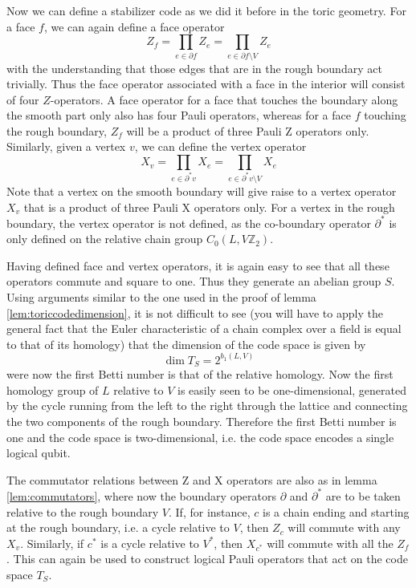 \documentclass[a4paper, draft]{article}
\theoremstyle{own}
\theoremstyle{remark}
\newcommand{\Z}{\mathbb{Z}}
\begin{document}
Now we can define a stabilizer code as we did it before in the toric geometry. For a face $f$, we can again define a face operator
$$
Z_f = \prod_{e \in \partial f} Z_e = \prod_{e \in \partial f \setminus V} Z_e
$$
with the understanding that those edges that are in the rough boundary act trivially. Thus the face operator associated with a face in the interior will consist of four $Z$-operators. A face operator for a face that touches the boundary along the smooth part only also has four Pauli operators, whereas for a face $f$ touching the rough boundary, $Z_f$ will be a product of three Pauli Z operators only. Similarly, given a vertex $v$, we can define the vertex operator
$$
X_v = \prod_{e \in \partial^* v} X_e = \prod_{e \in \partial^* v \setminus V} X_e
$$
Note that a vertex on the smooth boundary will give raise to a vertex operator $X_v$ that is a product of three Pauli X operators only. For a vertex in the rough boundary, the vertex operator is not defined, as the co-boundary operator $\partial^*$ is only defined on the relative chain group $C_0(L,V\Z_2)$. 

Having defined face and vertex operators, it is again easy to see that all these operators commute and square to one. Thus they generate an abelian group $S$. Using arguments similar to the one used in the proof of lemma \ref{lem:toriccodedimension}, it is not difficult to see (you will have to apply the general fact that the Euler characteristic of a chain complex over a field is equal to that of its homology) that the dimension of the code space is given by 
$$
\dim T_S = 2^{b_1(L,V)}
$$
were now the first Betti number is that of the relative homology. Now the first homology group of $L$ relative to $V$ is easily seen to be one-dimensional, generated by the cycle running from the left to the right through the lattice and connecting the two components of the rough boundary. Therefore the first Betti number is one and the code space is two-dimensional, i.e. the code space encodes a single logical qubit.

The commutator relations between Z and X operators are also as in lemma \ref{lem:commutators}, where now the boundary operators $\partial$ and $\partial^*$ are to be taken relative to the rough boundary $V$. If, for instance, $c$ is a chain ending and starting at the rough boundary, i.e. a cycle relative to $V$, then $Z_c$ will commute with any $X_v$. Similarly, if $c^*$ is a cycle relative to $V^*$, then $X_{c^*}$ will commute with all the $Z_f$. This can again be used to construct logical Pauli operators that act on the code space $T_S$. 
\end{document}
